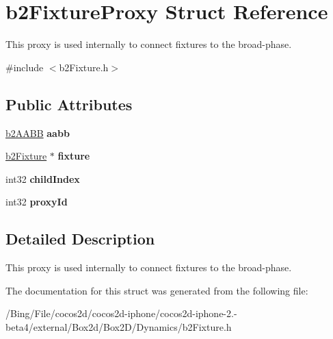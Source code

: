 \hypertarget{structb2_fixture_proxy}{\section{b2\-Fixture\-Proxy Struct Reference}
\label{structb2_fixture_proxy}
}


This proxy is used internally to connect fixtures to the broad-\/phase.  




{\ttfamily \#include $<$b2\-Fixture.\-h$>$}

\subsection*{Public Attributes}
\begin{DoxyCompactItemize}
\item 
\hypertarget{structb2_fixture_proxy_ad8950f61ce28cfa5b676065d4d843da7}{\hyperlink{structb2_a_a_b_b}{b2\-A\-A\-B\-B} {\bfseries aabb}}\label{structb2_fixture_proxy_ad8950f61ce28cfa5b676065d4d843da7}

\item 
\hypertarget{structb2_fixture_proxy_a3a0842dc9699c25658548c2005d0ef62}{\hyperlink{classb2_fixture}{b2\-Fixture} $\ast$ {\bfseries fixture}}\label{structb2_fixture_proxy_a3a0842dc9699c25658548c2005d0ef62}

\item 
\hypertarget{structb2_fixture_proxy_a2edb15552cf71f48dacc3608bb134166}{int32 {\bfseries child\-Index}}\label{structb2_fixture_proxy_a2edb15552cf71f48dacc3608bb134166}

\item 
\hypertarget{structb2_fixture_proxy_aa0ca7e71341368fe6c6913fb39c7283b}{int32 {\bfseries proxy\-Id}}\label{structb2_fixture_proxy_aa0ca7e71341368fe6c6913fb39c7283b}

\end{DoxyCompactItemize}


\subsection{Detailed Description}
This proxy is used internally to connect fixtures to the broad-\/phase. 

The documentation for this struct was generated from the following file\-:\begin{DoxyCompactItemize}
\item 
/\-Bing/\-File/cocos2d/cocos2d-\/iphone/cocos2d-\/iphone-\/2.-\/beta4/external/\-Box2d/\-Box2\-D/\-Dynamics/b2\-Fixture.\-h\end{DoxyCompactItemize}

